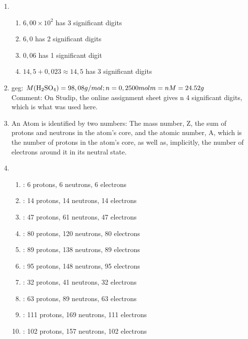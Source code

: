 \documentclass{article}
\begin{document}
\begin{enumerate}
	
    \item \begin{enumerate}
			\item $6,00\times10^2$ has 3 significant digits
            \item $6,0$ has 2 significant digits
            \item $0,06$ has 1 significant digit
            \item $14,5+0,023 \approx 14,5$ has 3 significant digits
		\end{enumerate}
    
    \item geg: $M(\ce{H2SO4})=98,08g/mol ; n=0,2500mol m=nM=24.52g$
    \\Comment: On Studip, the online assignment sheet gives n 4 significant digits, which is what was used here. 
    
    \item An Atom is identified by two numbers: The mass number, Z, the sum of protons and neutrons in the atom's core, and the atomic number, A, which is the number of protons in the atom's core, as well as, implicitly, the number of electrons around it in its neutral state.
 	\item \begin{enumerate}
             \item {}: 6 protons, 6 neutrons, 6 electrons
             \item {}: 14 protons, 14 neutrons, 14 electrons
             \item {}: 47 protons, 61 neutrons, 47 electrons
             \item {}: 80 protons, 120 neutrons, 80 electrons
             \item {}: 89 protons, 138 neutrons, 89 electrons
             \item {}: 95 protons, 148 neutrons, 95 electrons
             \item {}: 32 protons, 41 neutrons, 32 electrons
             \item {}: 63 protons, 89 neutrons, 63 electrons
             \item {}: 111 protons, 169 neutrons, 111 electrons
             \item {}: 102 protons, 157 neutrons, 102 electrons
    	 \end{enumerate}
    

\end{enumerate}
\end{document}
